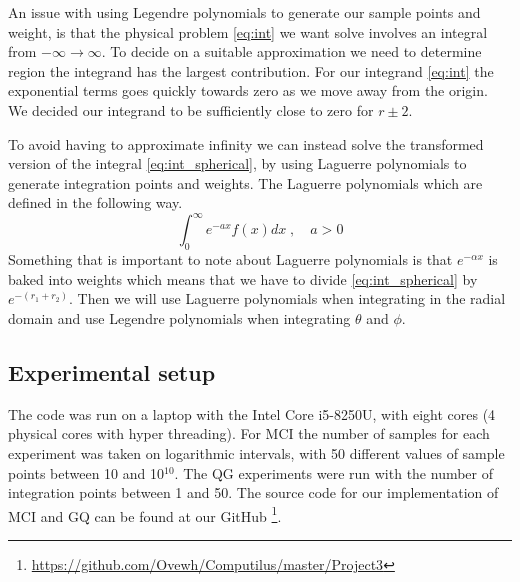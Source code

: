 An issue with using Legendre polynomials to generate our sample points and
weight, is that the physical problem \cref{eq:int} we want solve involves an
integral from $-\infty \to \infty$. To decide on a suitable approximation we
need to determine region the integrand has the largest contribution. For our
integrand \cref{eq:int} the exponential terms goes quickly towards zero as we
move away from the origin. We decided our integrand to be sufficiently close to
zero for $r \pm 2 $.

To avoid having to approximate infinity we can instead solve the
transformed version of the integral \cref{eq:int_spherical}, by using Laguerre
polynomials to generate integration points and weights. The Laguerre polynomials
which are defined in the following way.
\begin{equation}\label{eq:laguerre}
  \int_0^{\infty} e^{-a x} f(x)dx \; , \quad a > 0
\end{equation}
Something that is important to note about Laguerre polynomials is that
$e^{-\alpha x}$ is baked into weights which means that we have to divide
\cref{eq:int_spherical} by $e^{-(r_1 + r_2)}$. Then we will use Laguerre
polynomials when integrating in the radial domain and use Legendre polynomials
when integrating $\theta$ and $\phi$.



\subsection{Experimental setup}

The code was run on a laptop with the Intel Core i5-8250U, with eight cores
(4 physical cores with hyper threading). For MCI
the number of samples for each experiment was taken on logarithmic intervals,
with 50 different values of sample points between 10 and 10$^{10}$. The QG
experiments were run with the number of integration points between 1 and 50.
The source code for our implementation of MCI and GQ can be found at our GitHub
\footnote{\url{https://github.com/Ovewh/Computilus/master/Project3}}.
